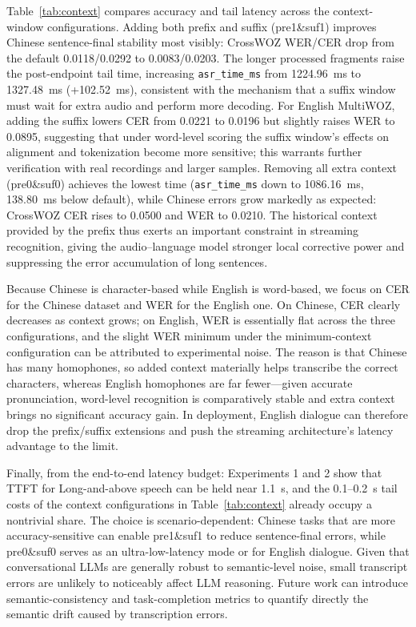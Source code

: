 \documentclass[pdflatex,iicol,Numbered,sn-basic]{sn-jnl}%
\begin{document}
Table~\ref{tab:context} compares accuracy and tail latency across the context-window configurations. Adding both prefix and suffix (pre1\&suf1) improves Chinese sentence-final stability most visibly: CrossWOZ WER/CER drop from the default 0.0118/0.0292 to 0.0083/0.0203. The longer processed fragments raise the post-endpoint tail time, increasing \texttt{asr\_time\_ms} from 1224.96~ms to 1327.48~ms (+102.52~ms), consistent with the mechanism that a suffix window must wait for extra audio and perform more decoding. For English MultiWOZ, adding the suffix lowers CER from 0.0221 to 0.0196 but slightly raises WER to 0.0895, suggesting that under word-level scoring the suffix window's effects on alignment and tokenization become more sensitive; this warrants further verification with real recordings and larger samples. Removing all extra context (pre0\&suf0) achieves the lowest time (\texttt{asr\_time\_ms} down to 1086.16~ms, 138.80~ms below default), while Chinese errors grow markedly as expected: CrossWOZ CER rises to 0.0500 and WER to 0.0210. The historical context provided by the prefix thus exerts an important constraint in streaming recognition, giving the audio--language model stronger local corrective power and suppressing the error accumulation of long sentences.

Because Chinese is character-based while English is word-based, we focus on CER for the Chinese dataset and WER for the English one. On Chinese, CER clearly decreases as context grows; on English, WER is essentially flat across the three configurations, and the slight WER minimum under the minimum-context configuration can be attributed to experimental noise. The reason is that Chinese has many homophones, so added context materially helps transcribe the correct characters, whereas English homophones are far fewer---given accurate pronunciation, word-level recognition is comparatively stable and extra context brings no significant accuracy gain. In deployment, English dialogue can therefore drop the prefix/suffix extensions and push the streaming architecture's latency advantage to the limit.

Finally, from the end-to-end latency budget: Experiments 1 and 2 show that TTFT for Long-and-above speech can be held near 1.1~s, and the 0.1--0.2~s tail costs of the context configurations in Table~\ref{tab:context} already occupy a nontrivial share. The choice is scenario-dependent: Chinese tasks that are more accuracy-sensitive can enable pre1\&suf1 to reduce sentence-final errors, while pre0\&suf0 serves as an ultra-low-latency mode or for English dialogue. Given that conversational LLMs are generally robust to semantic-level noise, small transcript errors are unlikely to noticeably affect LLM reasoning. Future work can introduce semantic-consistency and task-completion metrics to quantify directly the semantic drift caused by transcription errors.
\end{document}
